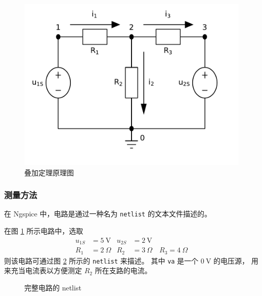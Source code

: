 \documentclass[UTF8,linespread=1.236]{ctexart}
\newcommand\unitV{\:\mathrm{V}}
\newcommand\unitOhm{\:\Omega}
\begin{document}
\begin{figure}[htbp]
{\begin{minipage}{0.25\textwidth}
    \includegraphics[width=\textwidth]{complete.pdf}
\end{minipage}}
\caption{叠加定理原理图}\label{circuits}
\end{figure}

\subsubsection{测量方法}

在 Ngspice 中，电路是通过一种名为 \verb|netlist| 的文本文件描述的。

在图 \ref{circuits} 所示电路中，选取
\[
\begin{aligned}
u_{1S} &= 5 \unitV & u_{2S} &= 2 \unitV \\
R_1 &= 2 \unitOhm & R_2 &= 3 \unitOhm \quad R_3 = 4 \unitOhm
\end{aligned}
\]
则该电路可通过图 \ref{netlistfile} 所示的 \verb|netlist| 来描述。
其中 \verb|va| 是一个 $0\unitV$ 的电压源，
用来充当电流表以方便测定 $R_2$ 所在支路的电流。

\begin{figure}[!htbp]
\centering
{}
\caption{完整电路的 netlist}\label{netlistfile}
\end{figure}
\end{document}
